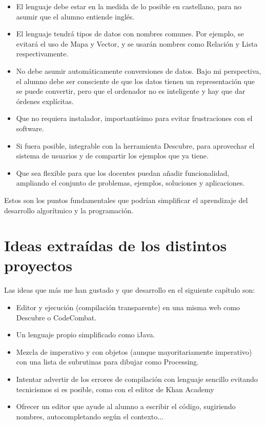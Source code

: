\documentclass{report}
\begin{document}
	\begin{itemize}
		\item El lenguaje debe estar en la medida de lo posible en castellano, para no asumir que el alumno entiende inglés.
		\item El lenguaje tendrá tipos de datos con nombres comunes. Por ejemplo, se evitará el uso de Mapa y Vector, y se usarán nombres como Relación y Lista respectivamente.
		\item No debe asumir automáticamente conversiones de datos. Bajo mi perspectiva, el alumno debe ser consciente de que los datos tienen un representación que se puede convertir, pero que el ordenador no es inteligente y hay que dar órdenes explícitas.
		\item Que no requiera instalador, importantísimo para evitar frustraciones con el software. 
		\item Si fuera posible, integrable con la herramienta Descubre, para aprovechar el sistema de usuarios y de compartir los ejemplos que ya tiene.
		\item Que sea flexible para que los docentes puedan añadir funcionalidad, ampliando el conjunto de problemas, ejemplos, soluciones y aplicaciones.
	\end{itemize} 
	
	Estos son los puntos fundamentales que podrían simplificar el aprendizaje del desarrollo algorítmico y la programación.
	
	\section{Ideas extraídas de los distintos proyectos}
	
	Las ideas que más me han gustado y que desarrollo en el siguiente capítulo son:
	
	\begin{itemize}
		\item Editor y ejecución (compilación transparente) en una misma web como Descubre o CodeCombat.
		\item Un lenguaje propio simplificado como iJava. 
		\item Mezcla de imperativo y con objetos (aunque mayoritariamente imperativo) con una lista de subrutinas para dibujar como Processing.
		\item Intentar advertir de los errores de compilación con lenguaje sencillo evitando tecnicismos si es posible, como con el editor de Khan Academy
		\item Ofrecer un editor que ayude al alumno a escribir el código, sugiriendo nombres, autocompletando según el contexto...
	\end{itemize}
	
\end{document}
